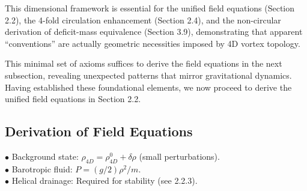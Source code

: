This dimensional framework is essential for the unified field equations (Section 2.2), the 4-fold circulation enhancement (Section 2.4), and the non-circular derivation of deficit-mass equivalence (Section 3.9), demonstrating that apparent ``conventions'' are actually geometric necessities imposed by 4D vortex topology.

This minimal set of axioms suffices to derive the field equations in the next subsection, revealing unexpected patterns that mirror gravitational dynamics. Having established these foundational elements, we now proceed to derive the unified field equations in Section 2.2.

\medskip
\noindent
{}
\medskip

\subsection{Derivation of Field Equations}

\begin{tcolorbox}[title=Key Assumptions]
$\bullet$ Background state: $\rho_{4D} = \rho_{4D}^0 + \delta \rho$ (small perturbations). \\
$\bullet$ Barotropic fluid: $P = (g/2) \rho^2 / m$. \\
$\bullet$ Helical drainage: Required for stability (see 2.2.3).
\end{tcolorbox}

